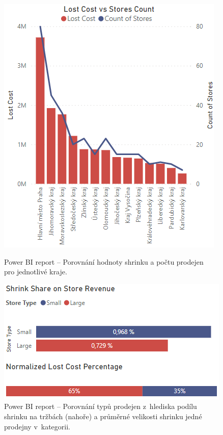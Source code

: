 \begin{figure}[hbtp!]
    \centering
    \begin{minipage}{.5\textwidth}
        \centering
        \captionsetup{justification=centering}
        \includegraphics[width=\textwidth]{obrazky/PBI/vsLoc.png}
        \caption{Power BI report -- Porovnání hodnoty shrinku a počtu prodejen \\pro jednotlivé kraje.}
        \label{obr:PBI:locvs}
    \end{minipage}%
    \begin{minipage}{.5\textwidth}
        \centering
        \captionsetup{justification=centering}
        \includegraphics[width=\textwidth]{obrazky/PBI/normTypes.png}
        \caption{Power BI report -- Porovnání typů prodejen z~hlediska podílu shrinku na tržbách (nahoře) a průměrné velikosti shrinku jedné prodejny v~kategorii.}
        \label{obr:PBI:types}
    \end{minipage}
\end{figure}

